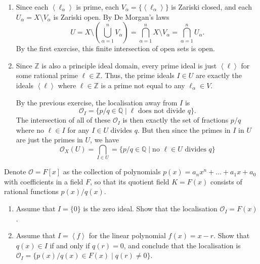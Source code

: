 \documentclass[12 pt, letterpaper]{hmcpset}
\begin{document}
\begin{solution}
	\begin{enumerate}
		\item Since each $\left < \ell_{\alpha} \right >$ is prime, each $V_{\alpha} = \{ \left < \ell_{\alpha} \right > \}$ is Zariski closed, and each $U_{\alpha} = X \setminus V_{\alpha}$ is Zariski open. By De Morgan's laws
			\[
				U = X \setminus \left ( \bigcup_{\alpha = 1}^{n} V_{\alpha} \right ) = \bigcap_{\alpha = 1}^{n} X \setminus V_{\alpha} = \bigcap_{\alpha = 1}^{n} U_{\alpha}.
			\]
			By the first exercise, this finite intersection of open sets is open.
		\item Since $\mathbb{Z}$ is also a principle ideal domain, every prime ideal is just $\left < \ell \right >$ for some rational prime $\ell \in \mathbb{Z}$. Thus, the prime ideals $I \in U$ are exactly the ideals $\left < \ell \right >$ where $\ell \in \mathbb{Z}$ is a prime not equal to any $\ell_{\alpha} \in V$. 

			By the previous exercise, the localisation away from $I$ is
			\[
				\mathcal{O}_{I} = \{ p / q \in \mathbb{Q} \mid \ell \text{ does not divide } q \}.
			\]
			The intersection of all of these $\mathcal{O}_{I}$ is then exactly the set of fractions $p / q$ where no  $\ell \in I$ for any $I \in U$ divides $q$. But then since the primes in $I$ in $U$ are just the primes in $U$, we have
			\[
				\mathcal{O}_{X}(U) = \bigcap_{I \in U} = \{ p / q \in \mathbb{Q} \mid \text{no } \ell \in U \text{ divides } q \}
			\]
	\end{enumerate}
\end{solution}

\pagebreak

\begin{problem}[Problem 4.]
	Denote $\mathcal{O} = F[x]$ as the collection of polynomials $p(x) = a_{n} x^{n} + \dots + a_{1} x + a_{0}$ with coefficients in a field $F$, so that its quotient field $K = F(x)$ consists of rational functions $p(x) / q(x)$.
	\begin{enumerate}
		\item Assume that $I = \{ 0 \}$ is the zero ideal. Show that the localisation $\mathcal{O}_{I} = F(x)$.
		\item Assume that $I = \left < f \right >$ for the linear polynomial $f(x) = x - r$. Show that $q(x) \in I$ if and only if $q(r) = 0$, and conclude that the localisation is $\mathcal{O}_{I} = \{ p(x) / q(x) \in F(x) \mid q(r) \neq 0 \}$.
	\end{enumerate}
\end{problem}
\end{document}
